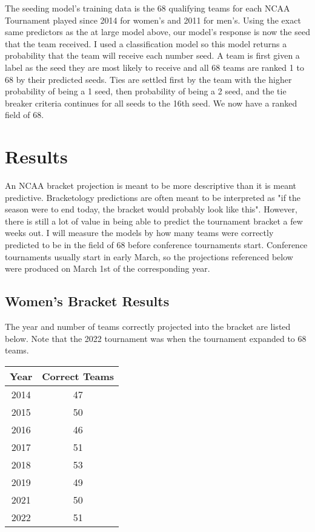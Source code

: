 \documentclass{article}
\begin{document}

The seeding model's training data is the 68 qualifying teams for each NCAA Tournament played since 2014 for women's and 2011 for men's. Using the exact same predictors as the at large model above, our model's response is now the seed that the team received. I used a classification model so this model returns a probability that the team will receive each number seed. A team is first given a label as the seed they are most likely to receive and all 68 teams are ranked 1 to 68 by their predicted seeds. Ties are settled first by the team with the higher probability of being a 1 seed, then probability of being a 2 seed, and the tie breaker criteria continues for all seeds to the 16th seed. We now have a ranked field of 68.

\section{Results}

An NCAA bracket projection is meant to be more descriptive than it is meant predictive. Bracketology predictions are often meant to be interpreted as "if the season were to end today, the bracket would probably look like this". However, there is still a lot of value in being able to predict the tournament bracket a few weeks out. I will measure the models by how many teams were correctly predicted to be in the field of 68 before conference tournaments start. Conference tournaments usually start in early March, so the projections referenced below were produced on March 1st of the corresponding year.

\subsection{Women's Bracket Results}

The year and number of teams correctly projected into the bracket are listed below. Note that the 2022 tournament was when the tournament expanded to 68 teams.

\begin{center}
\begin{tabular} {c | c}
Year  & Correct Teams \\
\hline
2014 & 47 \\
2015 & 50 \\
2016 & 46 \\
2017 & 51 \\
2018 & 53 \\
2019 & 49 \\
2021 & 50 \\
2022 & 51
\end{tabular}
\end{center}
\end{document}
